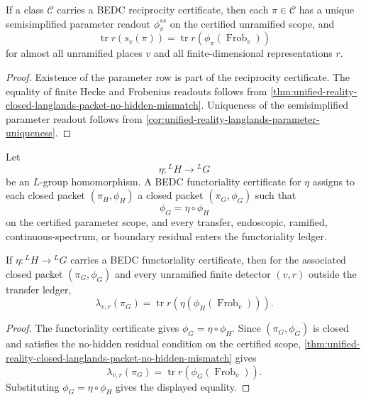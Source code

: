 \begin{theorem}
\label{thm:unified-reality-conditional-bedc-reciprocity}
If a class $\mathcal C$ carries a BEDC reciprocity certificate, then
each $\pi\in\mathcal C$ has a unique semisimplified parameter readout
$\phi_{\pi}^{ss}$ on the certified unramified scope, and
$$
\operatorname{tr}r(s_v(\pi))
=
\operatorname{tr}r(\phi_{\pi}(\operatorname{Frob}_v))
$$
for almost all unramified places $v$ and all finite-dimensional
representations $r$.
\end{theorem}
\begin{proof}
Existence of the parameter row is part of the reciprocity certificate.
The equality of finite Hecke and Frobenius readouts follows from
\autoref{thm:unified-reality-closed-langlands-packet-no-hidden-mismatch}.
Uniqueness of the semisimplified parameter readout follows from
\autoref{cor:unified-reality-langlands-parameter-uniqueness}.
\end{proof}

\begin{definition}
\label{def:unified-reality-bedc-functoriality-certificate}
Let
$$
\eta:{}^LH\longrightarrow{}^LG
$$
be an $L$-group homomorphism. A BEDC functoriality certificate for
$\eta$ assigns to each closed packet $(\pi_H,\phi_H)$ a closed packet
$(\pi_G,\phi_G)$ such that
$$
\phi_G=\eta\circ\phi_H
$$
on the certified parameter scope, and every transfer, endoscopic,
ramified, continuous-spectrum, or boundary residual enters the
functoriality ledger.
\end{definition}

\begin{theorem}
\label{thm:unified-reality-conditional-bedc-functoriality}
If $\eta:{}^LH\to{}^LG$ carries a BEDC functoriality certificate, then
for the associated closed packet $(\pi_G,\phi_G)$ and every unramified
finite detector $(v,r)$ outside the transfer ledger,
$$
\lambda_{v,r}(\pi_G)
=
\operatorname{tr}r(\eta(\phi_H(\operatorname{Frob}_v))).
$$
\end{theorem}
\begin{proof}
The functoriality certificate gives $\phi_G=\eta\circ\phi_H$. Since
$(\pi_G,\phi_G)$ is closed and satisfies the no-hidden residual
condition on the certified scope,
\autoref{thm:unified-reality-closed-langlands-packet-no-hidden-mismatch}
gives
$$
\lambda_{v,r}(\pi_G)
=
\operatorname{tr}r(\phi_G(\operatorname{Frob}_v)).
$$
Substituting $\phi_G=\eta\circ\phi_H$ gives the displayed equality.
\end{proof}


